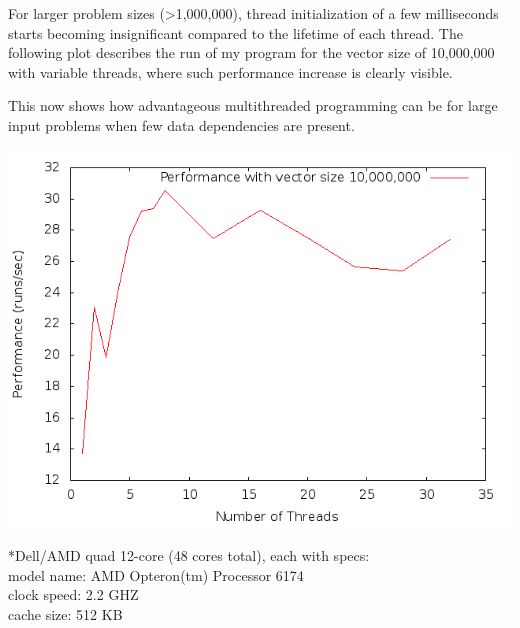 \documentclass{article}
\begin{document}
  For larger problem sizes (\textgreater1,000,000), thread initialization of a few milliseconds starts becoming insignificant compared to the lifetime of each thread.
  The following plot describes the run of my program for the vector size of 10,000,000 with variable threads, where such performance increase is clearly visible.

  This now shows how advantageous multithreaded programming can be for large input problems when few data dependencies are present.

  \centerline{\includegraphics[width=\textwidth]{10000000}}

  *Dell/AMD quad 12-core (48 cores total), each with specs:\\
  model name: AMD Opteron(tm) Processor 6174 \\
  clock speed: 2.2 GHZ \\
  cache size: 512 KB \\

  
  
  
\end{document}
